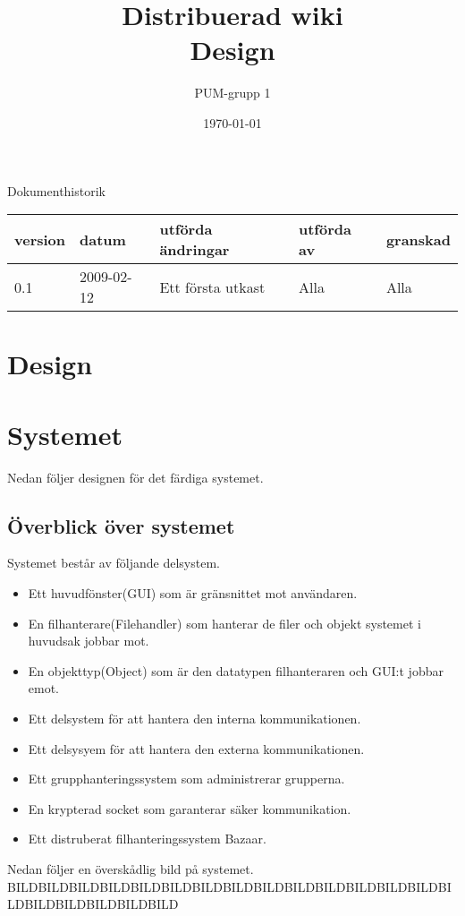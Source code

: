 

\ifpdf
\else
\fi

\title{Distribuerad wiki \\ Design}
\author{PUM-grupp 1}
\date{\today}



\maketitle

\thispagestyle{empty}

\newpage

{\centering \Large{Dokumenthistorik\\}}

\vspace{10pt}
\begin{tabularx}{\textwidth}{ |l|l|X|l|l| }
  \hline
    \textbf{version} & \textbf{datum} & \textbf{utförda ändringar} & \textbf{utförda av} & \textbf{granskad} \\
	\hline 
  0.1 & 2009-02-12 &  Ett första utkast  & Alla & Alla   \\
  \hline
\end{tabularx}

\newpage

\setcounter{tocdepth}{2}
\tableofcontents
\newpage

\section{Design}

\section{Systemet}
Nedan följer designen för det färdiga systemet.
\subsection{Överblick över systemet}
Systemet består av följande delsystem. 
\begin{itemize}
\item Ett huvudfönster(GUI) som är gränsnittet mot användaren.
\item En filhanterare(Filehandler) som hanterar de filer och objekt systemet i huvudsak jobbar mot.
\item En objekttyp(Object) som är den datatypen filhanteraren och GUI:t jobbar emot.
\item Ett delsystem för att hantera den interna kommunikationen.
\item Ett delsysyem för att hantera den externa kommunikationen. 
\item Ett grupphanteringssystem som administrerar grupperna.
\item En krypterad socket som garanterar säker kommunikation.
\item Ett distruberat filhanteringssystem Bazaar.
\end{itemize}
Nedan följer en överskådlig bild på systemet.
BILDBILDBILDBILDBILDBILDBILDBILDBILDBILDBILDBILDBILDBILDBILDBILDBILDBILDBILDBILD
